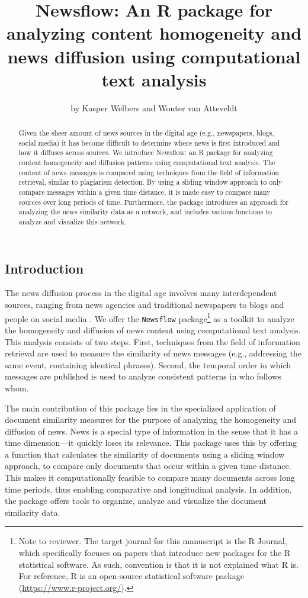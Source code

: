 \documentclass[]{article}
\title{Newsflow: An R package for analyzing content homogeneity and news
diffusion using computational text analysis}
\author{by Kasper Welbers and Wouter van Atteveldt}
\date{}
\let\rmarkdownfootnote\footnote%
\def\footnote{\protect\rmarkdownfootnote}
\begin{document}
\maketitle

\begin{abstract}
Given the sheer amount of news sources in the digital age (e.g.,
newspapers, blogs, social media) it has become difficult to determine
where news is first introduced and how it diffuses across sources. We
introduce Newsflow: an R package for analyzing content homogeneity and
diffusion patterns using computational text analysis. The content of
news messages is compared using techniques from the field of information
retrieval, similar to plagiarism detection. By using a sliding window
approach to only compare messages within a given time distance, it is
made easy to compare many sources over long periods of time.
Furthermore, the package introduces an approach for analyzing the news
similarity data as a network, and includes various functions to analyze
and visualize this network.
\end{abstract}

\subsection{Introduction}\label{introduction}

The news diffusion process in the digital age involves many
interdependent sources, ranging from news agencies and traditional
newspapers to blogs and people on social media
\citep{meraz11, paterson05, pew10}. We offer the \texttt{Newsflow}
package\footnote{Note to reviewer. The target journal for this
  manuscript is the R Journal, which specifically focuses on papers that
  introduce new packages for the R statistical software. As such,
  convention is that it is not explained what R is. For reference, R is
  an open-source statistical software package
  (\url{https://www.r-project.org/}).} as a toolkit to analyze the
homogeneity and diffusion of news content using computational text
analysis. This analysis consists of two steps. First, techniques from
the field of information retrieval are used to measure the similarity of
news messages (e.g., addressing the same event, containing identical
phrases). Second, the temporal order in which messages are published is
used to analyze consistent patterns in who follows whom.

The main contribution of this package lies in the specialized
application of document similarity measures for the purpose of analyzing
the homogeneity and diffusion of news. News is a special type of
information in the sense that it has a time dimension---it quickly loses
its relevance. This package uses this by offering a function that
calculates the similarity of documents using a sliding window approach,
to compare only documents that occur within a given time distance. This
makes it computationally feasible to compare many documents across long
time periods, thus enabling comparative and longitudinal analysis. In
addition, the package offers tools to organize, analyze and visualize
the document similarity data.
\end{document}
